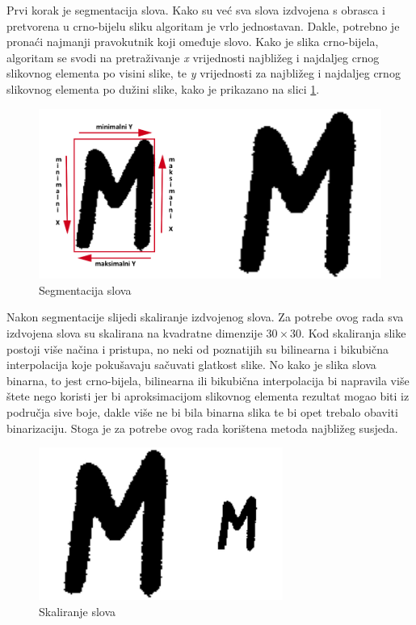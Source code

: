 Prvi korak je segmentacija slova. Kako su već sva slova izdvojena s obrasca i pretvorena u crno-bijelu sliku algoritam je vrlo jednostavan. Dakle, potrebno je pronaći najmanji pravokutnik koji omeđuje slovo. Kako je slika crno-bijela, algoritam se svodi na pretraživanje \emph{x} vrijednosti najbližeg i najdaljeg crnog slikovnog elementa po visini slike, te \emph{y} vrijednosti za najbližeg i najdaljeg crnog slikovnog elementa po dužini slike, kako je prikazano na slici \ref{fig:crop_example}.
\begin{figure}[htb]
    \centering
    \includegraphics[width=12cm]{images/crop_example.jpg}
    \caption{Segmentacija slova}
    \label{fig:crop_example}
\end{figure}

Nakon segmentacije slijedi skaliranje izdvojenog slova. Za potrebe ovog rada sva izdvojena slova su skalirana na kvadratne dimenzije $30 \times 30$. Kod skaliranja slike postoji više načina i pristupa, no neki od poznatijih su bilinearna i bikubična interpolacija koje pokušavaju sačuvati glatkost slike. No kako je slika slova binarna, to jest crno-bijela, bilinearna ili bikubična interpolacija bi napravila više štete nego koristi jer bi aproksimacijom slikovnog elementa rezultat mogao biti iz područja sive boje, dakle više ne bi bila binarna slika te bi opet trebalo obaviti binarizaciju. Stoga je za potrebe ovog rada korištena metoda najbližeg susjeda.

\begin{figure}[htb]
    \centering
    \includegraphics[width=8cm]{images/resize_example.jpg}
    \caption{Skaliranje slova}
    \label{fig:resize_example}
\end{figure}

